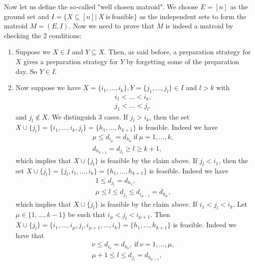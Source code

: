\documentclass{article}
\begin{document}
\begin{flushleft}
Now let us define the so-called "well chosen matroid".
We choose $E=[n]$ as the ground set and $I=\{X\subseteq[n]|\ X\ \mathrm{is\ feasible}\}$ as the independent sets to form the matroid $M=(E,I)$.
Now we need to prove that $M$ is indeed a matroid by checking the 2 conditions:
\begin{enumerate}
    \item Suppose we $X\in I$ and $Y\subseteq X$. Then, as said before, a preparation strategy for $X$ gives a preparation strategy for $Y$ by forgetting some of the preparation day. So $Y\in I$.
    \item Now suppose we have $X=\{i_1,\ldots,i_k\},Y=\{j_1,\ldots,j_l\}\in I$ and $l>k$ with
          \begin{align*}
              i_1<\ldots<i_k,\\
              j_1<\ldots<j_l.
          \end{align*} 
          and $j_l\notin X$. We distinguish 3 cases.\newline
          If $j_l>i_k$, then the set $X\cup\{j_l\}=\{i_1,\ldots,i_k,j_l\}=\{h_1,\ldots,h_{k+1}\}$ is feasible. Indeed we have
          \begin{gather*}
              \mu\leq d_{i_\mu}=d_{h_\mu}\ \mathrm{if}\ \mu=1,\ldots,k,\\
              d_{h_{k+1}}=d_{j_l}\geq l\geq k+1,
          \end{gather*}
          which implies that $X\cup\{j_l\}$ is feasible by the claim above.\newline
          If $j_l < i_1$, then the set $X\cup\{j_l\}=\{j_l,i_1,\ldots,i_k\}=\{h_1,\ldots,h_{k+1}\}$ is feasible. Indeed we have
          \begin{gather*}
              1\leq d_{j_l}=d_{h_1},\\
              \mu\leq l\leq d_{j_l}\leq d_{i_{\mu-1}}=d_{h_\mu},
          \end{gather*}
          which implies that $X\cup\{j_l\}$ is feasible by the claim above.\newline
          If $i_1<j_l<i_k$. Let $\mu\in\{1,\ldots,k-1\}$ be such that $i_\mu < j_l < i_{\mu+1}$.
          Then $X\cup\{j_l\}=\{i_1,\ldots,i_\mu,j_l,i_{\mu+1},\ldots,i_k\}=\{h_1,\ldots,h_{k+1}\}$ is feasible. Indeed we have that 
          \begin{gather*}
              \nu\leq d_{i_\nu}=d_{h_\nu},\ \mathrm{if}\ \nu=1,\ldots,\mu,\\
              \mu+1\leq l\leq d_{j_l}=d_{h_{\mu+1}},\\

\end{gather*}
\end{enumerate}
\end{flushleft}
\end{document}
